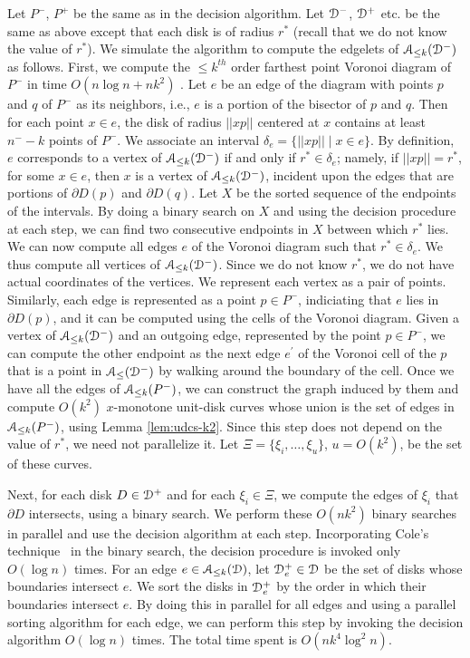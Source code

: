 \documentclass[11pt]{myclass}
\newcommand{\EuD}{\ensuremath{\EuScript{D}}}
\newcommand{\EuA}{\ensuremath{\EuScript{A}}}
\begin{document}
Let $P^-$, $P^+$ be the same as in the decision algorithm.  Let $\EuD^-$, $\EuD^+$ etc. be the same as above except that each disk is of radius $r^*$ (recall that we do not know the value of $r^*$).  We simulate the algorithm to compute the edgelets of $\EuA_{\leq k}(\EuD^-)$ as follows.  First, we compute the ${\le} k^{th}$ order farthest point Voronoi diagram of $P^-$ in time $O(n \log n + nk^2)$ \cite{AGSS89}.  Let $e$ be an edge of the diagram with points $p$ and $q$ of $P^-$ as its neighbors, i.e., $e$ is a portion of the bisector of $p$ and $q$.  Then for each point $x \in e$, the disk of radius $||xp||$ centered at $x$ contains at least $n^- - k$ points of $P^-$.  We associate an interval $\delta_e = \{||xp|| \mid x \in e\}$.  By definition, $e$ corresponds to a vertex of $\EuA_{\leq k}(\EuD^-)$ if and only if $r^* \in \delta_e$; namely, if $||xp||=r^*$, for some $x \in e$, then $x$ is a vertex of $\EuA_{\leq k}(\EuD^-)$, incident upon the edges that are portions of $\partial D(p)$ and $\partial D(q)$.  
Let $X$ be the sorted sequence of the endpoints of the intervals.
By doing a binary search on $X$ and using the decision procedure at each step, we can find two consecutive endpoints in $X$ between which $r^*$ lies.  We can now compute all edges $e$ of the Voronoi diagram such that $r^* \in \delta_e$.  We thus compute all vertices of $\EuA_{\leq k}(\EuD^-)$.  
Since we do not know $r^*$, we do not have actual coordinates of the vertices.  We represent each vertex as a pair of points.  
Similarly, each edge is represented as a point $p \in P^-$, indiciating that $e$ lies in $\partial D(p)$, and it can be computed using the cells of the Voronoi diagram.  Given a vertex of $\EuA_{\leq k}(\EuD^-)$ and an outgoing edge, represented by the point $p \in P^-$, we can compute the other endpoint as the next edge $e^\prime$ of the Voronoi cell of the $p$ that is a point in $\EuA_{\leq}(\EuD^-)$ by walking around the boundary of the cell.  
Once we have all the edges of $\EuA_{\leq k}(P^-)$, we can construct the graph induced by them and compute $O(k^2)$ $x$-monotone unit-disk curves whose union is the set of edges in $\EuA_{\leq k}(P^-)$, using Lemma \ref{lem:udcs-k2}.  Since this step does not depend on the value of $r^*$, we need not parallelize it.  Let $\Xi = \{\xi_i, \ldots, \xi_u\}$, $u=O(k^2)$, be the set of these curves.  

Next, for each disk $D \in \EuD^+$ and for each $\xi_i \in \Xi$, we compute the edges of $\xi_i$ that $\partial D$ intersects, using a binary search.  We perform these $O(nk^2)$ binary searches in parallel and use the decision algorithm at each step.  Incorporating Cole's technique~\cite{Col87} in the binary search, the decision procedure is invoked only $O(\log n)$ times.  For an edge $e \in \EuA_{\leq k}(\EuD)$, let $\EuD_e^+ \in \EuD$ be the set of disks whose boundaries intersect $e$.  We sort the disks in $\EuD_e^+$ by the order in which their boundaries intersect $e$.  By doing this in parallel for all edges and using a parallel sorting algorithm for each edge, we can perform this step by invoking the decision algorithm $O(\log n)$ times.  
The total time spent is $O(nk^4 \log^2 n)$.
\end{document}
